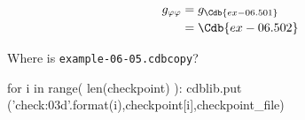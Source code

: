 \documentclass[12pt]{cdblatex}
\begin{document}
\begin{align*}
   g_{\varphi\varphi} &= g_{\Cdb{ex-06.501}}\\
                      &= \Cdb{ex-06.502}
\end{align*}

%
{}%
{Where is {\tt example-06-05.cdbcopy}?}

\clearpage


\bgroup
{}
\begin{cadabra}
   for i in range( len(checkpoint) ):
      cdblib.put ('check{:03d}'.format(i),checkpoint[i],checkpoint_file)
\end{cadabra}
\egroup
\end{document}
